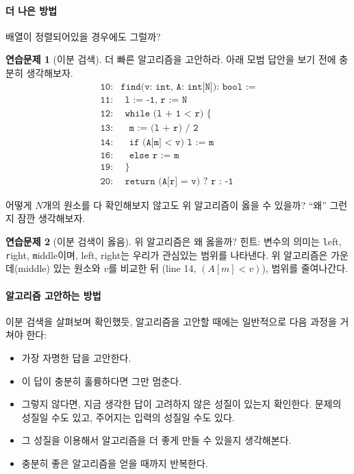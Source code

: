 \documentclass{oblivoir}
\theoremstyle{definition}
\newtheorem{exercise}{연습문제}
\begin{document}
\paragraph{더 나은 방법}
배열이 정렬되어있을 경우에도 그럴까?
\begin{exercise}[이분 검색]
  더 빠른 알고리즘을 고안하라.  아래 모범 답안을 보기 전에 충분히
  생각해보자.
  \begin{align*}
    \texttt{10:}& \texttt{find(v: int, A: int[N]): bool :=} \\
    \texttt{11:}& \ \ \texttt{l := -1, r := N} \\
    \texttt{12:}& \ \ \texttt{while (l + 1 < r) \{} \\
    \texttt{13:}& \ \ \ \ \texttt{m := (l + r) / 2} \\
    \texttt{14:}& \ \ \ \ \texttt{if (A[m] < v) l := m} \\
    \texttt{16:}& \ \ \ \ \texttt{else r := m} \\
    \texttt{19:}& \ \ \texttt{\}} \\
    \texttt{20:}& \ \ \texttt{return (A[r] = v) ? r : -1}
  \end{align*}
\end{exercise}

어떻게 $N$개의 원소를 다 확인해보지 않고도 위 알고리즘이 옳을 수
있을까?  ``왜'' 그런지 잠깐 생각해보자.

\begin{exercise}[이분 검색이 옳음]
  위 알고리즘은 왜 옳을까? 힌트: 변수의 의미는 \texttt{l}eft,
  \texttt{r}ight, \texttt{m}iddle이며, left, right는 우리가 관심있는
  범위를 나타낸다.  위 알고리즘은 가운데(middle) 있는 원소와 $v$를
  비교한 뒤 (line 14, $(A[m] < v)$), 범위를 줄여나간다.
\end{exercise}

\paragraph{알고리즘 고안하는 방법}
이분 검색을 살펴보며 확인했듯, 알고리즘을 고안할 때에는 일반적으로 다음
과정을 거쳐야 한다:
\begin{itemize}
\item 가장 자명한 답을 고안한다.
\item 이 답이 충분히 훌륭하다면 그만 멈춘다.
\item 그렇지 않다면, 지금 생각한 답이 고려하지 않은 성질이 있는지
  확인한다.  문제의 성질일 수도 있고, 주어지는 입력의 성질일 수도
  있다.
\item 그 성질을 이용해서 알고리즘을 더 좋게 만들 수 있을지 생각해본다.
\item 충분히 좋은 알고리즘을 얻을 때까지 반복한다.
\end{itemize}
\end{document}
